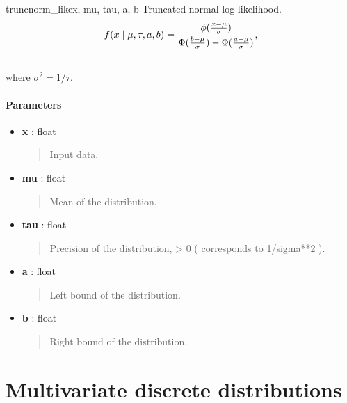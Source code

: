 \hypertarget{pymc.distributions.truncnorm_like}{}\begin{funcdesc}{truncnorm\_like}{x, mu, tau, a, b}
Truncated normal log-likelihood.
\begin{gather}
\begin{split}f(x \mid \mu, \tau, a, b) = \frac{\phi(\frac{x-\mu}{\sigma})} {\Phi(\frac{b-\mu}{\sigma}) - \Phi(\frac{a-\mu}{\sigma})},\end{split}\notag\\\begin{split}\end{split}\notag
\end{gather}
where $\sigma^2=1/\tau$.
\paragraph{Parameters}\begin{itemize}

\item[] \textbf{x} : float
\begin{quote}

Input data.
\end{quote}

\item[] \textbf{mu} : float
\begin{quote}

Mean of the distribution.
\end{quote}

\item[] \textbf{tau} : float
\begin{quote}

Precision of the distribution, \textgreater{} 0 ( corresponds to 1/sigma**2 ).
\end{quote}

\item[] \textbf{a} : float
\begin{quote}

Left bound of the distribution.
\end{quote}

\item[] \textbf{b} : float
\begin{quote}

Right bound of the distribution.
\end{quote}
\end{itemize}
\end{funcdesc}


\section{Multivariate discrete distributions}

